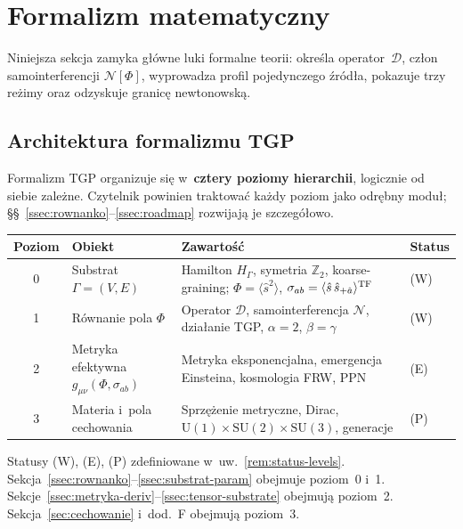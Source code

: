 \section{Formalizm matematyczny}\label{sec:formalizm}

Niniejsza sekcja zamyka g\l{}\'owne luki formalne teorii:
okre\'sla operator~$\mathcal{D}$, cz\l{}on samointerferencji
$\mathcal{N}[\Phi]$, wyprowadza profil pojedynczego \'zr\'od\l{}a,
pokazuje trzy re\.zimy oraz odzyskuje granic\k{e} newtonowsk\k{a}.

\subsection{Architektura formalizmu TGP}\label{ssec:architektura}

\begin{remark}\label{rem:hierarchia-sektorow}
Formalizm TGP organizuje si\k{e} w~\textbf{cztery poziomy hierarchii},
logicznie od siebie zale\.zne. Czytelnik powinien traktowa\'c ka\.zdy
poziom jako odr\k{e}bny modu\l{}; \S\S~\ref{ssec:rownanko}--\ref{ssec:roadmap}
rozwijaj\k{a} je szczeg\'o\l{}owo.

\medskip
\begin{center}\small
\begin{tabular}{@{}clp{6.0cm}l@{}}
\toprule
\textbf{Poziom} & \textbf{Obiekt} & \textbf{Zawarto\'s\'c} & \textbf{Status} \\
\midrule
0 & Substrat $\Gamma = (V,E)$ &
  Hamilton $H_\Gamma$, symetria $\mathbb{Z}_2$,
  koarse-graining; $\Phi = \langle\hat{s}^2\rangle$,
  $\sigma_{ab} = \langle\hat{s}\,\hat{s}_{+\hat{a}}\rangle^{\rm TF}$
  & (W) \\[4pt]
1 & R\'ownanie pola $\Phi$ &
  Operator $\mathcal{D}$, samointerferencja $\mathcal{N}$,
  dzia\l{}anie TGP, $\alpha=2$, $\beta=\gamma$
  & (W) \\[4pt]
2 & Metryka efektywna $g_{\mu\nu}(\Phi,\sigma_{ab})$ &
  Metryka eksponencjalna, emergencja Einsteina,
  kosmologia FRW, PPN
  & (E) \\[4pt]
3 & Materia i~pola cechowania &
  Sprzężenie metryczne, Dirac, $\mathrm{U}(1)\times\mathrm{SU}(2)
  \times\mathrm{SU}(3)$, generacje
  & (P) \\
\bottomrule
\end{tabular}
\end{center}

\medskip
\noindent Statusy (W), (E), (P) zdefiniowane w~uw.~\ref{rem:status-levels}.
Sekcja~\ref{ssec:rownanko}--\ref{ssec:substrat-param} obejmuje poziom~0 i~1.
Sekcje~\ref{ssec:metryka-deriv}--\ref{ssec:tensor-substrate} obejmuj\k{a} poziom~2.
Sekcja~\ref{sec:cechowanie} i~dod.~F obejmuj\k{a} poziom~3.
\end{remark}

